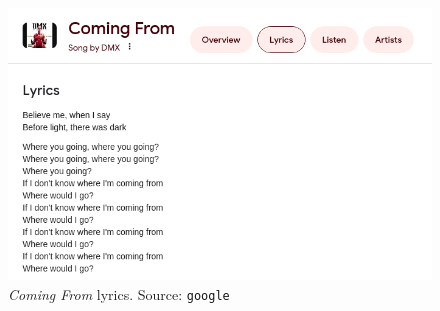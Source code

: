 \begin{frame}{}

\begin{figure}[t!] \centering
        \includegraphics[scale=0.33,frame]{./figures/01/lyrics.png}
        \caption{\textit{Coming From} lyrics. Source: \texttt{google}}
\end{figure}

\end{frame}
